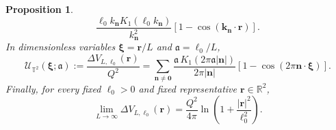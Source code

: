 \documentclass[openacc]{rsproca_new}%
\newtheorem{proposition}{\bf Proposition}[section]
\begin{document}
\begin{proposition}
\begin{equation}
\frac{\ell_0 k_{\mathbf n}K_1(\ell_0 k_{\mathbf n})}{k_{\mathbf n}^2}
\left[1-\cos(\mathbf k_{\mathbf n}\cdot\mathbf r)\right].
\end{equation}
In dimensionless variables \(\boldsymbol{\xi}=\mathbf r/L\) and \(\mathfrak a=\ell_0/L\),
\begin{equation}\label{Uax}
  \mathcal U_{\mathbb T^2}(\boldsymbol{\xi};\mathfrak a):=\frac{\Delta V_{L,\ell_0}(\mathbf r)}{Q^2}
  =\sum_{\mathbf n\neq\mathbf 0}
  \frac{\mathfrak a\,K_1(2\pi\mathfrak a|\mathbf n|)}{2\pi|\mathbf n|}
  \left[1-\cos(2\pi\mathbf n\cdot\boldsymbol{\xi})\right].
\end{equation}
Finally, for every fixed \(\ell_0>0\) and fixed representative \(\mathbf r\in\mathbb R^2\),
\begin{equation}
  \lim_{L\to\infty}\Delta V_{L,\ell_0}(\mathbf r)
  =\frac{Q^2}{4\pi}\ln\left(1+\frac{|\mathbf r|^2}{\ell_0^2}\right).
\end{equation}
\end{proposition}
\end{document}

